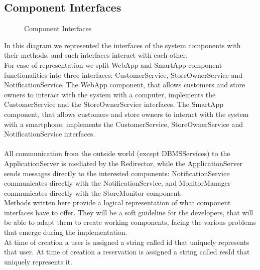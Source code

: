 \subsection{Component Interfaces}
\begin{figure}[H]
	\noindent
	\caption{Component Interfaces} %
\end{figure}
In this diagram we represented the interfaces of the system components with their methods, and such interfaces interact with each other.\\
For ease of representation we split WebApp and SmartApp component functionalities into three interfaces: CustomerService, StoreOwnerService and NotificationService. The WebApp component, that allows customers and store owners to interact with the system with a computer, implements the CustomerService and the StoreOwnerService interfaces. The SmartApp component, that allows customers and store owners to interact with the system with a smartphone, implements the CustomerService, StoreOwnerService and NotificationService interfaces.\\\\
All communication from the outside world (except DBMSServices) to the ApplicationServer is mediated by the Redirector, while the ApplicationServer sends messages directly to the interested components: NotificationService communicates directly with the NotificationService, and MonitorManager communicates directly with the StoreMonitor component.\\
Methods written here provide a logical representation of what component interfaces have to offer. They will be a soft guideline for the developers, that will be able to adapt them to create working components, facing the various problems that emerge during the implementation.\\
At time of creation a user is assigned a string called id that uniquely represents that user. At time of creation a reservation is assigned a string called resId that uniquely represents it.\\
